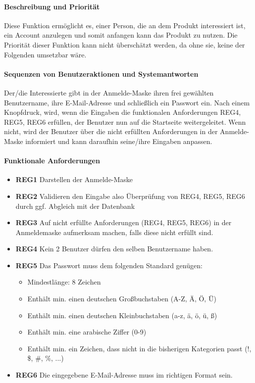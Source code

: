\paragraph{Beschreibung und Priorität}
Diese Funktion ermöglicht es, einer Person, die an dem Produkt interessiert ist, ein Account anzulegen und somit anfangen kann das Produkt zu nutzen. Die Priorität dieser Funktion kann nicht überschätzt werden, da ohne sie, keine der Folgenden umsetzbar wäre.
\paragraph{Sequenzen von Benutzeraktionen und Systemantworten} Der/die Interessierte gibt in der Anmelde-Maske ihren frei gewählten Benutzername, ihre E-Mail-Adresse und schließlich ein Passwort ein. Nach einem Knopfdruck, wird, wenn die Eingaben die funktionalen Anforderungen REG4, REG5, REG6 erfüllen, der Benutzer nun auf die Startseite weitergeleitet. Wenn nicht, wird der Benutzer über die nicht erfüllten Anforderungen in der Anmelde-Maske informiert und kann daraufhin seine/ihre Eingaben anpassen.
\paragraph{Funktionale Anforderungen}
\begin{itemize}
	\item \textbf{REG1} Darstellen der Anmelde-Maske
	\item \textbf{REG2} Validieren den Eingabe also Überprüfung von REG4, REG5, REG6  durch ggf. Abgleich mit der Datenbank
	\item \textbf{REG3} Auf nicht erfüllte Anforderungen (REG4, REG5, REG6) in der Anmeldemaske aufmerksam machen, falls diese nicht erfüllt sind.
	\item \textbf{REG4} Kein 2 Benutzer dürfen den selben Benutzername haben.
	\item \textbf{REG5} Das Passwort muss dem folgenden Standard genügen:
	\begin{itemize}
		\item Mindestlänge: 8 Zeichen
		\item Enthält min. einen deutschen Großbuchstaben (A-Z, Ä, Ö, Ü)
		\item Enthält min. einen deutschen Kleinbuchstaben (a-z, ä, ö, ü, ß)
		\item Enthält min. eine arabische Ziffer (0-9)
		\item Enthält min. ein Zeichen, dass nicht in die bisherigen Kategorien passt (!, \$, \#, \%, ...)
	\end{itemize}
	\item \textbf{REG6} Die eingegebene E-Mail-Adresse muss im richtigen Format sein.
	
\end{itemize}

